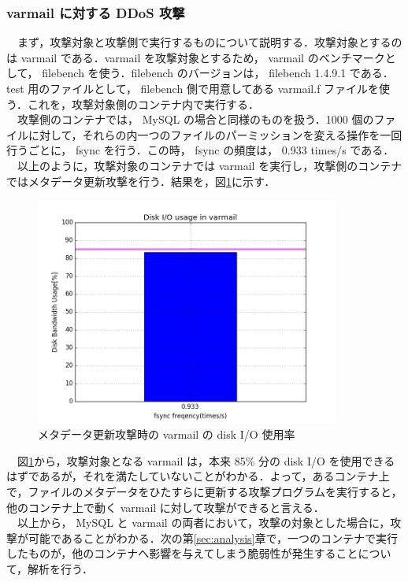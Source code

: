 \documentclass[graduation-thesis]{jsarticle}
\begin{document}
\subsubsection{varmail に対する DDoS 攻撃}
　まず，攻撃対象と攻撃側で実行するものについて説明する．攻撃対象とするのは varmail である．varmail を攻撃対象とするため， varmail のベンチマークとして， filebench を使う．filebench のバージョンは， filebench 1.4.9.1 である．test 用のファイルとして， filebench 側で用意してある varmail.f ファイルを使う．これを，攻撃対象側のコンテナ内で実行する．\\
　攻撃側のコンテナでは， MySQL の場合と同様のものを扱う．1000 個のファイルに対して，それらの内一つのファイルのパーミッションを変える操作を一回行うごとに， fsync を行う．この時， fsync の頻度は， 0.933 times/s である．
　以上のように，攻撃対象のコンテナでは varmail を実行し，攻撃側のコンテナではメタデータ更新攻撃を行う．結果を，図\ref{fig:varmail-example}に示す．\\
\begin{figure}[H]
	\begin{center}
		\includegraphics[width=10.0cm]{images/FiguresForGraduation/varmail_single1.png}
		\caption{メタデータ更新攻撃時の varmail の disk I/O 使用率}
		\label{fig:varmail-example}
	\end{center}
\end{figure}
　図\ref{fig:varmail-example}から，攻撃対象となる varmail は，本来 85\% 分の disk I/O を使用できるはずであるが，それを満たしていないことがわかる．よって，あるコンテナ上で，ファイルのメタデータをひたすらに更新する攻撃プログラムを実行すると，他のコンテナ上で動く varmail に対して攻撃ができると言える．\\
　以上から， MySQL と varmail の両者において，攻撃の対象とした場合に，攻撃が可能であることがわかる．次の第\ref{sec:analysis}章で，一つのコンテナで実行したものが，他のコンテナへ影響を与えてしまう脆弱性が発生することについて，解析を行う．\\
\end{document}
